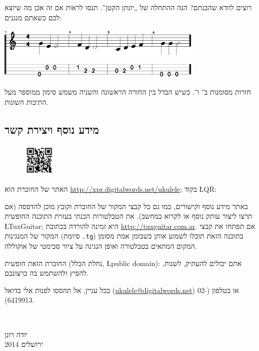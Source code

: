 רוצים לוודא שהבנתם? הנה ההתחלה של „יונתן הקטן”. תנסו לראות אם זה אכן מה שיוצא לכם כשאתם מנגנים:

\begin{center}
	\includegraphics[height=2.5cm]{jon.eps}
\end{center}

חזרות מסומנות ב־ ו־. כשיש הבדל בין החזרה הראשונה והשניה משמש סימון  ממוספר מעל התיבות השונות.



\subsection*{מידע נוסף ויצירת קשר}

\begin{figure}\vspace{-\baselineskip}\includegraphics[width=1.5cm]{retejo.png}\end{figure}
האתר של החוברת הוא \url{http://xpr.digitalwords.net/ukulele}; בקוד \L{QR}:

באתר מידע נוסף וקישורים, כמו גם כל קבצי המקור של החוברת וקובץ מוכן להדפסה (אם תרצו ליצור עותק נוסף או לקרוא במחשב). את הטבלטורות הכנתי בעזרת התוכנה החופשית \L{TuxGuitar}; היא זמינה להורדה בכתובת \url{http://tuxguitar.com.ar}. אם תפתחו את קבצי המקור של המנגינות (סיומת \texttt{.tg}) בתוכנה הזאת תוכלו לשמוע אותן כשבזמן אמת מסומן המקום המתאים בטבלטורה ואופן הנגינה על ציור סכימטי של אוקוללה.

החוברת הזאת חופשית (נחלת הכלל, \L{public domain}): אתם יכולים להעתיק, לשנות, להפיץ ולהשתמש בה כרצונכם.

בכל עניין, אל תהססו לפנות אלי בדואל (\url{ukulele@digitalwords.net}) או בטלפון (02-6419913).

\vspace{\baselineskip}
~\hfill
\begin{minipage}{3cm}
	יודה רונן\\
	ירושלים 2014\\
\end{minipage}
